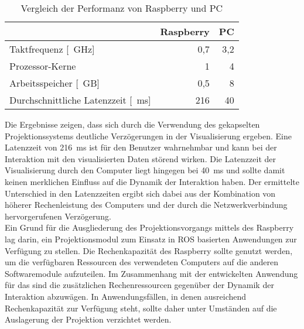 \begin{table}[ht]
\begin{center}
\setlength{\tabcolsep}{18pt}
\begin{tabular}{lrr}
\toprule
 & \multicolumn{1}{c}{Raspberry} & \multicolumn{1}{c}{PC}\\
\midrule
Taktfrequenz [\SI{}{\GHz}] & 0,7 & 3,2 \\ \addlinespace
Prozessor-Kerne & 1 & 4\\ \addlinespace
Arbeitsspeicher [\SI{}{GB}] & 0,5 & 8\\ \addlinespace
Durchschnittliche Latenzzeit [\SI{}{\milli\second}] & 216 & 40 \\
\bottomrule
\end{tabular}
\caption{Vergleich der Performanz von Raspberry und PC}
\label{tab.latency}
\end{center}
\end{table}


Die Ergebnisse zeigen, dass sich durch die Verwendung des gekapselten Projektionssystems deutliche Verzögerungen in der Visualisierung ergeben. Eine Latenzzeit von \SI{216}{\milli\second} ist für den Benutzer wahrnehmbar und kann bei der Interaktion mit den visualisierten Daten störend wirken. Die Latenzzeit der Visualisierung durch den Computer liegt hingegen bei \SI{40}{\milli\second} und sollte damit keinen merklichen Einfluss auf die Dynamik der Interaktion haben. Der ermittelte Unterschied in den Latenzzeiten ergibt sich dabei aus der Kombination von höherer Rechenleistung des Computers und der  durch die Netzwerkverbindung hervorgerufenen Verzögerung.\\

Ein Grund für die Ausgliederung des Projektionsvorgangs mittels des Raspberry lag darin, ein Projektionsmodul zum Einsatz in ROS basierten Anwendungen zur Verfügung zu stellen. Die Rechenkapazität des Raspberry sollte genutzt werden, um die verfügbaren Ressourcen des verwendeten Computers auf die anderen Softwaremodule aufzuteilen. Im Zusammenhang mit der entwickelten Anwendung für das \kps{} sind die zusätzlichen Rechenressourcen gegenüber der Dynamik der Interaktion abzuwägen. In Anwendungsfällen, in denen ausreichend Rechenkapazität zur Verfügung steht, sollte daher unter Umständen auf die Auslagerung der Projektion verzichtet werden.